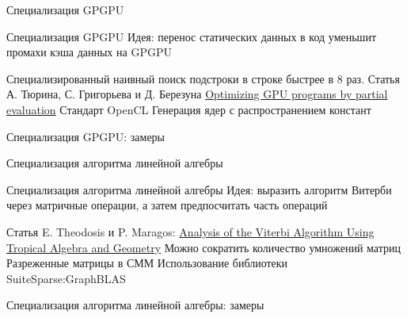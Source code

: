 \documentclass[hyperref={pdfpagelabels=false}]{beamer}
\begin{document}
\begin{frame}{Специализация GPGPU}
\begin{block}{Специализация GPGPU}
	Идея: перенос статических данных в код уменьшит промахи 
	кэша данных на GPGPU
\end{block}
\vfill
Специализированный наивный поиск подстроки в строке быстрее в 8 раз. 
Статья  А. Тюрина, С. Григорьева и Д. Березуна \href{https://www.researchgate.net/publication/339368918_Optimizing_GPU_programs_by_partial_evaluation}{Optimizing GPU programs by partial evaluation}
\vfill
Стандарт OpenCL
\vfill
Генерация ядер с распространением констант
\end{frame}


\begin{frame}{Специализация GPGPU: замеры}
\end{frame}


\begin{frame}{Специализация алгоритма линейной алгебры}
\begin{block}{Специализация алгоритма линейной алгебры}
	Идея: выразить алгоритм Витерби через матричные операции, 
		а затем предпосчитать часть операций
\end{block}
\vfill
	Статья E. Theodosis и P. Maragos: \href{http://cvsp.cs.ntua.gr/publications/confr/2018_TheodosisMaragos_AnalysisViterbi-TropicalAlgebraGeometry_SPAWC.pdf}
	{Analysis of the Viterbi Algorithm Using 
	Tropical Algebra and Geometry}
\vfill
	Можно сократить количество умножений матриц
\vfill
	Разреженные матрицы в СММ
\vfill
	Использование библиотеки SuiteSparse:GraphBLAS
\end{frame}


\begin{frame}{Специализация алгоритма линейной алгебры: замеры}
\end{frame}
\end{document}
